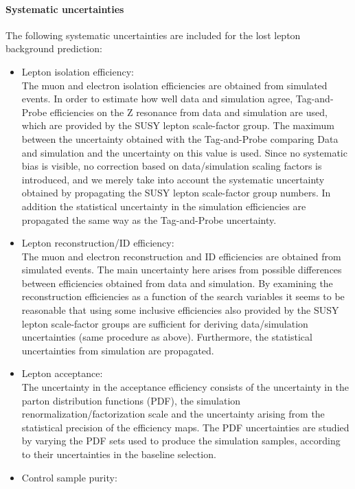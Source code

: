 \paragraph{Systematic uncertainties}

The following systematic uncertainties are included for the lost lepton background prediction:

\begin{itemize}
\item Lepton isolation efficiency:\\
  The muon and electron isolation efficiencies are obtained from simulated events. In order to estimate how well data and simulation agree, Tag-and-Probe efficiencies on the Z resonance from data and simulation are used, which are provided by the SUSY lepton scale-factor group. The maximum between the uncertainty obtained with the Tag-and-Probe comparing Data and simulation and the uncertainty on this value is used.
  Since no systematic bias is visible,
  no correction based on data/simulation scaling factors is introduced, and we merely take into account the systematic uncertainty obtained by propagating the SUSY lepton scale-factor group numbers.
  In addition the statistical uncertainty in the simulation efficiencies are
  propagated the same way as the Tag-and-Probe uncertainty.
  \item Lepton reconstruction/ID efficiency:\\
  The muon and electron reconstruction and ID efficiencies are obtained from simulated events. The main uncertainty here arises
  from possible differences between efficiencies obtained from data and simulation. By examining the reconstruction efficiencies as a function of the search variables it seems to be reasonable that using some inclusive efficiencies also provided by the SUSY lepton scale-factor groups are sufficient for deriving data/simulation uncertainties (same procedure as above). Furthermore, the statistical uncertainties from simulation are propagated.
\item Lepton acceptance:\\
  The uncertainty in the acceptance efficiency consists of the uncertainty
  in the parton distribution functions (PDF), the simulation renormalization/factorization scale
  and the uncertainty arising from the statistical precision of the efficiency maps.
  The PDF uncertainties are studied by varying the PDF sets used to produce the
  simulation samples, according to their uncertainties in the baseline selection.
\item Control sample purity:\\

\end{itemize}
